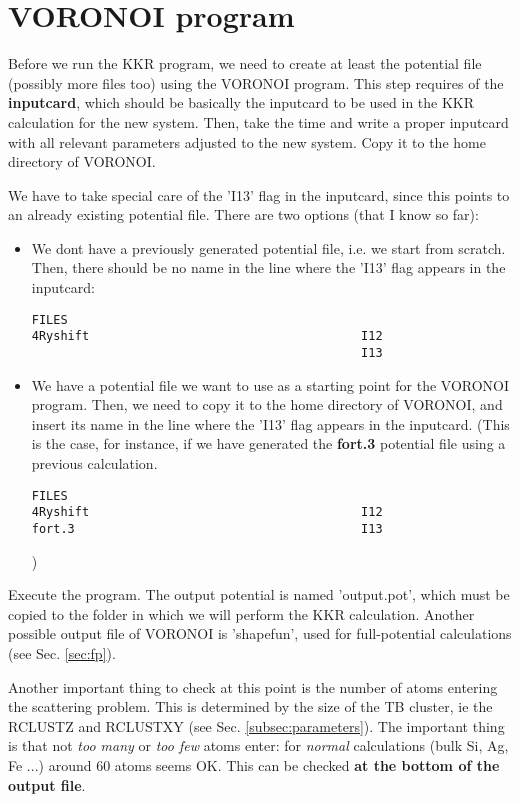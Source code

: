 \documentclass[a4paper,10pt,fullpage]{report}
\begin{document}
\section{VORONOI program}
\label{sec:voronoi}


Before we run the KKR program, we need to create at least
the potential file (possibly more files too) using the VORONOI
program. This step requires of the \textbf{inputcard}, which should
be basically the inputcard to be used in the KKR calculation
for the new system. Then, take the time and write a proper 
inputcard with all relevant parameters adjusted to the new system.
Copy it to the home directory of VORONOI.


We have to take special care of the 'I13' flag in the
inputcard, since this points to an already existing potential file. 
There are two options (that I know so far):

\begin{itemize}
\item We dont have a previously generated potential file, i.e. we start from
scratch. Then, there should be no name in the line where the 'I13' flag appears
in the inputcard:
\begin{verbatim}
FILES
4Ryshift                                      I12
                                              I13
\end{verbatim}  

\item We have a potential file we want to use as a starting point for the 
VORONOI program. Then, we need to copy it to the home directory of VORONOI,
and insert its name in the line where the 'I13' flag appears
in the inputcard. (This is the case, for instance, if we have generated the
\textbf{fort.3} potential file using a previous calculation.
\begin{verbatim}
FILES
4Ryshift                                      I12
fort.3                                        I13
\end{verbatim} 
)

\end{itemize}

Execute the program. The output potential is named 'output.pot', which must
be copied to the folder in which we will perform the KKR calculation.
Another possible output file of VORONOI is 'shapefun', used for full-potential 
calculations (see Sec. \ref{sec:fp}).


Another important thing to check at this point is the number of atoms entering the scattering problem.
This is determined by the size of the TB cluster, 
ie the RCLUSTZ and RCLUSTXY (see Sec. \ref{subsec:parameters}).
The important thing is that not \textit{too many} or \textit{too few} atoms enter: for \textit{normal} 
calculations (bulk Si, Ag, Fe ...) around 60 atoms seems OK. 
This can be checked \textbf{at the bottom of the output file}.
\end{document}
